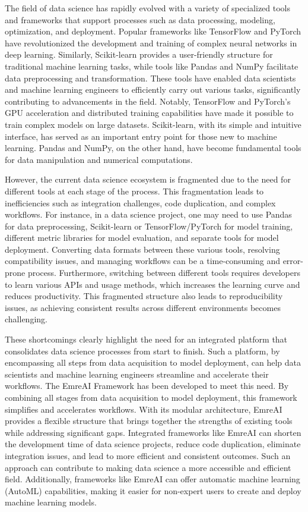 \documentclass[conference]{IEEEtran}
\begin{document}
The field of data science has rapidly evolved with a variety of specialized tools and frameworks that support processes such as data processing, modeling, optimization, and deployment. Popular frameworks like TensorFlow and PyTorch have revolutionized the development and training of complex neural networks in deep learning. Similarly, Scikit-learn provides a user-friendly structure for traditional machine learning tasks, while tools like Pandas and NumPy facilitate data preprocessing and transformation. These tools have enabled data scientists and machine learning engineers to efficiently carry out various tasks, significantly contributing to advancements in the field. Notably, TensorFlow and PyTorch’s GPU acceleration and distributed training capabilities have made it possible to train complex models on large datasets. Scikit-learn, with its simple and intuitive interface, has served as an important entry point for those new to machine learning. Pandas and NumPy, on the other hand, have become fundamental tools for data manipulation and numerical computations.

However, the current data science ecosystem is fragmented due to the need for different tools at each stage of the process. This fragmentation leads to inefficiencies such as integration challenges, code duplication, and complex workflows. For instance, in a data science project, one may need to use Pandas for data preprocessing, Scikit-learn or TensorFlow/PyTorch for model training, different metric libraries for model evaluation, and separate tools for model deployment. Converting data formats between these various tools, resolving compatibility issues, and managing workflows can be a time-consuming and error-prone process. Furthermore, switching between different tools requires developers to learn various APIs and usage methods, which increases the learning curve and reduces productivity. This fragmented structure also leads to reproducibility issues, as achieving consistent results across different environments becomes challenging.

These shortcomings clearly highlight the need for an integrated platform that consolidates data science processes from start to finish. Such a platform, by encompassing all steps from data acquisition to model deployment, can help data scientists and machine learning engineers streamline and accelerate their workflows. The EmreAI Framework has been developed to meet this need. By combining all stages from data acquisition to model deployment, this framework simplifies and accelerates workflows. With its modular architecture, EmreAI provides a flexible structure that brings together the strengths of existing tools while addressing significant gaps. Integrated frameworks like EmreAI can shorten the development time of data science projects, reduce code duplication, eliminate integration issues, and lead to more efficient and consistent outcomes. Such an approach can contribute to making data science a more accessible and efficient field. Additionally, frameworks like EmreAI can offer automatic machine learning (AutoML) capabilities, making it easier for non-expert users to create and deploy machine learning models.
\end{document}
